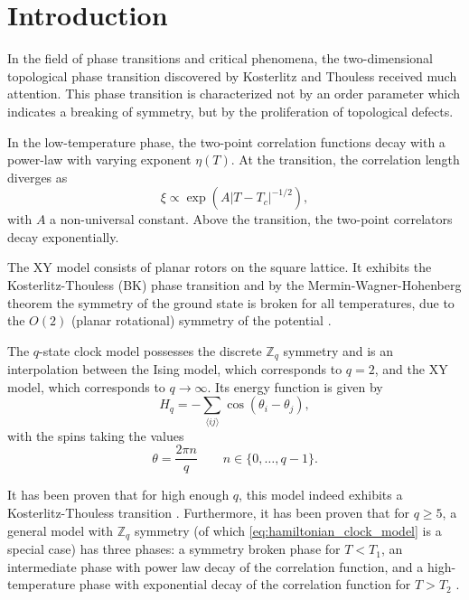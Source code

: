 

\section{Introduction}
In the field of phase transitions and critical phenomena, the two-dimensional topological phase transition discovered by
Kosterlitz and Thouless \cite{kosterlitz1973ordering, kosterlitz1974critical} received much attention. This phase
transition is characterized not by an order parameter which indicates a breaking of symmetry, but by the proliferation
of topological defects.

In the low-temperature phase, the two-point correlation functions decay with a power-law with varying
exponent $\eta(T)$. At the transition, the correlation length diverges as
\begin{equation}
  \xi \propto \exp(A |T - T_c|^{-1/2}),
\end{equation}
with $A$ a non-universal constant. Above the transition, the two-point correlators decay exponentially.

The XY model consists of planar rotors on the square lattice. It exhibits the Kosterlitz-Thouless (BK) phase transition
and by the Mermin-Wagner-Hohenberg theorem the symmetry of the ground state is broken for all temperatures, due to
the $O(2)$ (planar rotational) symmetry of the potential \cite{mermin1966absence, hohenberg1967existence}.

The $q$-state clock model possesses the discrete $\mathbb{Z}_q$ symmetry and is an interpolation between the Ising
model, which corresponds to $q = 2$, and the XY model, which corresponds to $q \to \infty$. Its energy function is given
by
\begin{equation}\label{eq:hamiltonian_clock_model}
  H_q = -\sum_{\langle i j \rangle} \cos(\theta_i - \theta_j),
\end{equation}
with the spins taking the values
\begin{equation}
  \theta = \frac{2 \pi n}{q} \qquad n \in \{ 0, \dots, q-1 \}.
\end{equation}

It has been proven that for high enough $q$, this model indeed exhibits a Kosterlitz-Thouless transition
\cite{frohlich1981kosterlitz}. Furthermore, it has been proven that for $q \geq 5$, a general model with $\mathbb{Z}_q$
symmetry (of which \autoref{eq:hamiltonian_clock_model} is a special case) has three phases: a symmetry broken phase for
$T < T_1$, an intermediate phase with power law decay of the correlation function, and a high-temperature phase with
exponential decay of the correlation function for $T > T_2$ \cite{cardy1980general}.

